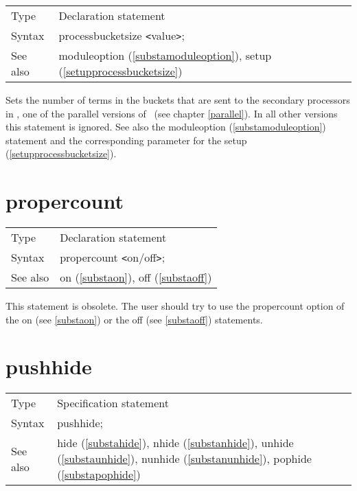 \noindent \begin{tabular}{ll}
Type & Declaration statement\\
Syntax & processbucketsize {\tt<}value{\tt>};
\\ See also & moduleoption (\ref{substamoduleoption}), setup 
(\ref{setupprocessbucketsize})
\end{tabular}\vspace{4mm}

\noindent Sets the number of terms in the buckets that are sent 
to the secondary processors in \ParFORM{}, one of the 
parallel versions of \FORM\ (see chapter \ref{parallel}). In 
all other versions this statement is ignored. See also the moduleoption 
(\ref{substamoduleoption}) statement and the corresponding parameter for 
the setup (\ref{setupprocessbucketsize}). \vspace{10mm}


\section{propercount}
\label{substapropercount}

\noindent \begin{tabular}{ll}
Type & Declaration statement\\
Syntax & propercount {\tt<}on/off{\tt>};
\\ See also & on (\ref{substaon}), off (\ref{substaoff})
\end{tabular} \vspace{4mm}

\noindent This statement is obsolete. 
The user should try to use the propercount option of the on (see 
\ref{substaon}) or the off (see \ref{substaoff}) statements. 
\vspace{10mm}


\section{pushhide}
\label{substapushhide}

\noindent \begin{tabular}{ll}
Type & Specification statement\\
Syntax & pushhide;
\\ See also & hide (\ref{substahide}),
              nhide (\ref{substanhide}),
              unhide (\ref{substaunhide}),
              nunhide (\ref{substanunhide}),
              pophide (\ref{substapophide})
\end{tabular} \vspace{4mm}

